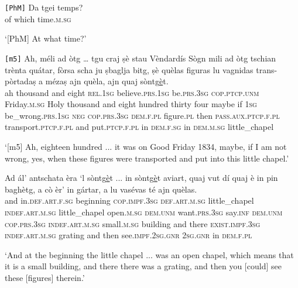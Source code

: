 \begin{linenumbers}
\gll \texttt{[PhM]} Da tgei temps?  \\
\textit{} of which time.\textsc{m.sg}   \\
\end{linenumbers}
\medskip 
\glt `[PhM] At what time?'
\medskip

\begin{linenumbers}
\gll  \texttt{[m5]} Ah, méli ad òtg … tgu craj ṣè stau Vèndardís Sògn mili ad òtg tschian trènta quátar, fòrsa scha ju ṣbaglja bitg, ṣè quèlas figuras lu vagnidas trans-pòrtadaṣ a mézaṣ ajn quèla, ajn quaj sòntg\underline{è}t.\\
\textit{} ah thousand and eight {} \textsc{rel.1sg} believe.\textsc{prs.1sg} be.\textsc{prs.3sg} \textsc{cop.ptcp.unm} Friday.\textsc{m.sg} Holy thousand and eight hundred thirty four maybe if \textsc{1sg} be\_wrong.\textsc{prs.1sg} \textsc{neg} \textsc{cop.prs.3sg} \textsc{dem.f.pl} figure.\textsc{pl} then \textsc{pass.aux.ptcp.f.pl} transport.\textsc{ptcp.f.pl} and put.\textsc{ptcp.f.pl} in \textsc{dem.f.sg} in \textsc{dem.m.sg} little\_chapel\\
\end{linenumbers}
\medskip
\glt `[m5] Ah, eighteen hundred ... it was on Good Friday 1834, maybe,  if I am not wrong, yes, when these figures were transported and put into this little chapel.'
\medskip

\begin{linenumbers}
\gll Ad ál’ antschata èra `l sòntg\underline{è}t ... in sòntg\underline{è}t aviart, quaj vut dí quaj è in pin baghètg, a cò èr’ in gártar, a lu vasévas té ajn quèlas.   \\
and in.\textsc{def.art.f.sg} beginning \textsc{cop.impf.3sg} \textsc{def.art.m.sg} little\_chapel {} \textsc{indef.art.m.sg} little\_chapel open.\textsc{m.sg} \textsc{dem.unm} want.\textsc{prs.3sg} say.\textsc{inf} \textsc{dem.unm} \textsc{cop.prs.3sg} \textsc{indef.art.m.sg} small.\textsc{m.sg} building and there \textsc{exist.impf.3sg} \textsc{indef.art.m.sg} grating and then see.\textsc{impf.2sg.gnr} \textsc{2sg.gnr} in \textsc{dem.f.pl}\\
\end{linenumbers}
\medskip
\glt `And at the beginning the little chapel ... was an open chapel, which means that it is a small building, and there there was a grating, and then you [could] see these [figures] therein.'
\medskip

